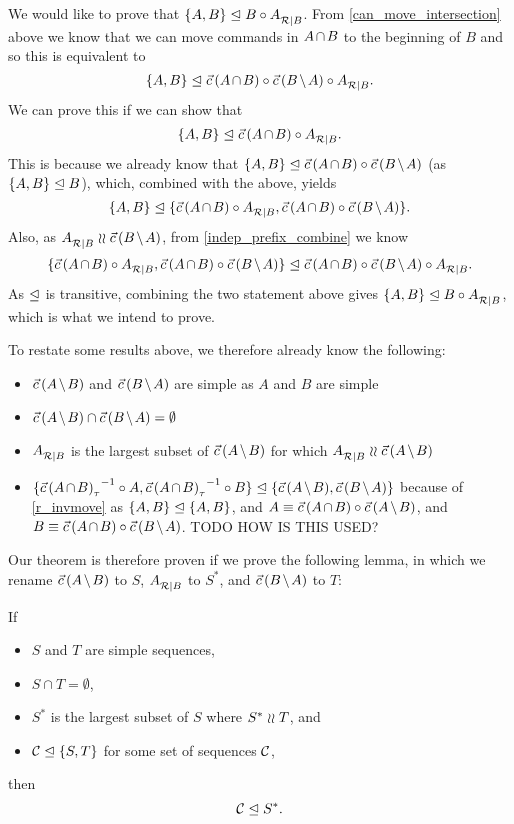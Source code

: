 \bigskip

\noindent
We would like to prove that ${\{{A,B}\}}\trianglelefteq{B\circ{A}^{}_{\mathcal{R}|{B}}}$.
From \cref{can_move_intersection} above we know that we can move commands in $\acbnp$
to the beginning of $B$ and so this is equivalent to
\[ \worksmbx{A,B}{\acb\cc \bma\cc \reca}. \]
We can prove this if we can show that
\[ \worksmbx{A,B}{\acb\cc \reca}. \]
This is because we already know
that $\worksmbx{A,B}{\acb\cc \bma}$ (as ${\{{A,B}\}}\trianglelefteq{B}$),
which, combined with the above, yields
\[ \worksmbb{A,B}{\acb\cc \reca, \acb\cc \bma}. \]
Also, as $\reca\indep\bma$,
from \cref{indep_prefix_combine}
we know
\[ \worksmbx{\acb\cc \reca, \acb\cc \bma}{\acb\cc \bma\cc \reca}. \]
As $\trianglelefteq$ is transitive, combining the two statement above
gives ${\{{A,B}\}}\trianglelefteq{B\circ{A}^{}_{\mathcal{R}|{B}}}$, which is what we intend to prove.

\bigskip

\noindent
To restate some results above, we therefore already know the following:
\begin{itemize}
\item $\amb$ and $\bma$ are simple as $A$ and $B$ are simple
\item $\amb \cap \bma = \emptyset$
\item ${A}^{}_{\mathcal{R}|{B}}$ is the largest subset of $\amb$ for which $\reca\indep\amb$
\item $\worksmbb{\acbi\cc A,\acbi\cc B}{\amb, \bma}$ 
because of \cref{r_invmove}
as ${\{{A,B}\}}\trianglelefteq{\{{A,B}\}}$,
and $A\equiv\acb\cc\amb$, and $B\equiv\acb\cc\bma$.
TODO HOW IS THIS USED?
\end{itemize}

Our theorem is therefore proven if we prove the following lemma,
in which we rename $\amb$ to $S$, ${A}^{}_{\mathcal{R}|{B}}$ to $S^*$, and $\bma$ to $T$:
\newcommand{\condSimple}{(c1)}
\newcommand{\condDisj}{(c2)}
\newcommand{\condApr}{(c3)}
\newcommand{\condWork}{(c4)}
\begin{mylem}\label{reconciliation_correct_part}
If
   \begin{itemize}
   \item[\condSimple] $S$ and $T$ are simple sequences,
   \item[\condDisj] $S\cap T=\emptyset$,
   \item[\condApr] $S^*$ is the largest subset of $S$ where $S^*\mathrel{\wr\wr} T$, and
   \item[\condWork] ${\mathcal{C}}\trianglelefteq{\{{S,T}\}}$ for some set of sequences $\mathcal{C}$,
   \end{itemize}
then
\[ {\mathcal{C}}\trianglelefteq{S^*}. \]
\end{mylem}

